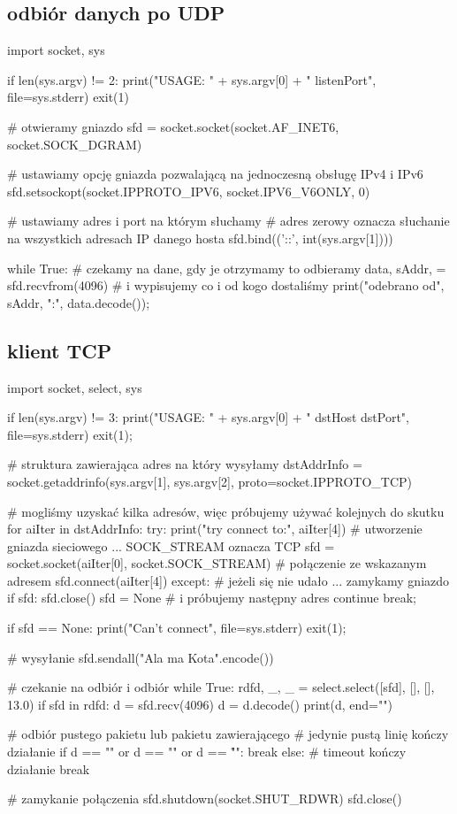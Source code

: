 \subsection{odbiór danych po UDP}
\begin{CodeFrame*}[python]{}
import socket, sys

if len(sys.argv) != 2:
  print("USAGE: " + sys.argv[0] + " listenPort", file=sys.stderr)
  exit(1)

# otwieramy gniazdo
sfd = socket.socket(socket.AF_INET6, socket.SOCK_DGRAM)

# ustawiamy opcję gniazda pozwalającą na jednoczesną obsługę IPv4 i IPv6
sfd.setsockopt(socket.IPPROTO_IPV6, socket.IPV6_V6ONLY, 0)

# ustawiamy adres i port na którym słuchamy
# adres zerowy oznacza słuchanie na wszystkich adresach IP danego hosta
sfd.bind(('::', int(sys.argv[1])))

while True:
  # czekamy na dane, gdy je otrzymamy to odbieramy
  data, sAddr, = sfd.recvfrom(4096)
  # i wypisujemy co i od kogo dostaliśmy
  print("odebrano od", sAddr, ":", data.decode());
\end{CodeFrame*}

\subsection{klient TCP}
\begin{CodeFrame*}[python]{}
import socket, select, sys

if len(sys.argv) != 3:
    print("USAGE: " + sys.argv[0] + " dstHost dstPort", file=sys.stderr)
    exit(1);

# struktura zawierająca adres na który wysyłamy
dstAddrInfo = socket.getaddrinfo(sys.argv[1], sys.argv[2], proto=socket.IPPROTO_TCP)

# mogliśmy uzyskać kilka adresów, więc próbujemy używać kolejnych do skutku
for aiIter in dstAddrInfo:
    try:
        print("try connect to:", aiIter[4])
        # utworzenie gniazda sieciowego ... SOCK_STREAM oznacza TCP
        sfd = socket.socket(aiIter[0], socket.SOCK_STREAM)
        # połączenie ze wskazanym adresem
        sfd.connect(aiIter[4])
    except:
        # jeżeli się nie udało ... zamykamy gniazdo
        if sfd:
            sfd.close()
        sfd = None
        # i próbujemy następny adres
        continue
    break;

if sfd == None:
    print("Can't connect", file=sys.stderr)
    exit(1);

# wysyłanie
sfd.sendall("Ala ma Kota\n".encode())

# czekanie na odbiór i odbiór
while True:
    rdfd, _, _ = select.select([sfd], [], [], 13.0)
    if sfd in rdfd:
        d = sfd.recv(4096)
        d = d.decode()
        print(d, end="")
        
        # odbiór pustego pakietu lub pakietu zawierającego
        # jedynie pustą linię kończy działanie
        if d == "" or d == "\n" or d == "\r\n":
            break
    else:
        # timeout kończy działanie
        break

# zamykanie połączenia
sfd.shutdown(socket.SHUT_RDWR)
sfd.close()
\end{CodeFrame*}


